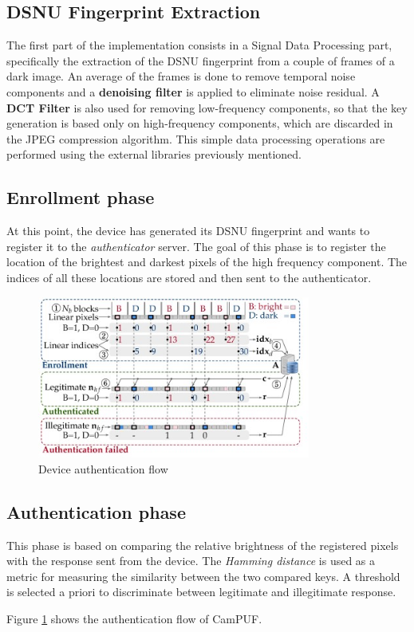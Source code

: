 \subsection{DSNU Fingerprint Extraction}
The first part of the implementation consists in a Signal Data Processing part, specifically the extraction of the DSNU fingerprint from a couple of frames of a dark image. 
An average of the frames is done to remove temporal noise components and a \textbf{denoising filter} is applied to eliminate noise residual.
A \textbf{DCT Filter} is also used for removing low-frequency components, so that the key generation is based only on high-frequency components, which are discarded in the JPEG compression algorithm.
This simple data processing operations are performed using the external libraries previously mentioned.

\subsection{Enrollment phase}
At this point, the device has generated its DSNU fingerprint and wants to register it to the \textit{authenticator} server.
The goal of this phase is to register the location of the brightest and darkest pixels of the high frequency component. The indices of all these locations are stored
and then sent to the authenticator.

\begin{figure}[h!]    
    \centering
    \includegraphics[width=0.8\textwidth]{images/device_auth_flow.jpg}
    \caption{Device authentication flow}
    \label{fig:authflow}
\end{figure}

\subsection{Authentication phase}
This phase is based on comparing the relative brightness of the registered pixels with the response sent from the device. The \textit{Hamming distance} is used as a
metric for measuring the similarity between the two compared keys. A threshold is selected a priori to discriminate between legitimate and illegitimate response.

Figure \ref{fig:authflow} shows the authentication flow of CamPUF.
